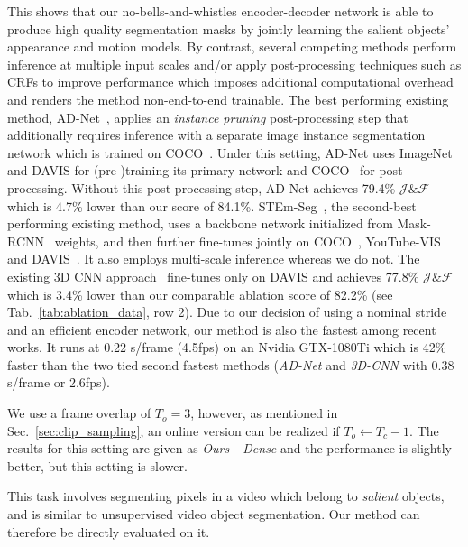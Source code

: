 \documentclass{bmvc2k}
\newcommand{\PAR}[1]{\vskip4pt \noindent {\bf #1~}}
\begin{document}
This shows that our no-bells-and-whistles encoder-decoder network is able to produce high quality segmentation masks by jointly learning the salient objects' appearance and motion models. 
By contrast, several competing methods perform inference at multiple input scales and/or apply post-processing techniques such as CRFs to improve performance which imposes additional computational overhead and renders the method non-end-to-end trainable. 
The best performing existing method, AD-Net~\cite{Yang19ICCVAnchorDiff}, applies an \textit{instance pruning} post-processing step that additionally requires inference with a separate image instance segmentation network which is trained on COCO~\cite{Lin14ECCV}. Under this setting, AD-Net uses ImageNet and DAVIS for (pre-)training its primary network and COCO~\cite{Lin14ECCV} for post-processing. Without this post-processing step, AD-Net achieves 79.4\% $\mathcal{J}\&\mathcal{F}$ which is 4.7\% lower than our score of 84.1\%. STEm-Seg~\cite{athar20arxiv}, the second-best performing existing method, uses a backbone network initialized from Mask-RCNN~\cite{He17ICCV} weights, and then further fine-tunes jointly on COCO~\cite{Lin14ECCV}, YouTube-VIS~\cite{Yang19ICCV} and DAVIS~\cite{Perazzi16CVPR}. It also employs multi-scale inference whereas we do not.
The existing 3D CNN approach~\cite{Hou19BMVC} fine-tunes only on DAVIS and achieves 77.8\% $\mathcal{J}\&\mathcal{F}$ which is 3.4\% lower than our comparable ablation score of 82.2\% (see Tab.~\ref{tab:ablation_data}, row 2).
Due to our decision of using a nominal stride and an efficient encoder network, our method is also the fastest among recent works. It runs at 0.22 s/frame (4.5fps) on an Nvidia GTX-1080Ti which is 42\% faster than the two tied second fastest methods (\textit{AD-Net} and \textit{3D-CNN} with 0.38 s/frame or 2.6fps).


We use a frame overlap of $T_o = 3$, however, as mentioned in Sec.~\ref{sec:clip_sampling}, an online version can be realized if $T_o \gets T_c-1$. The results for this setting are given as \textit{Ours - Dense} and the performance is slightly better, but this setting is slower.  



\PAR{Video Object Saliency:} This task involves segmenting pixels in a video which belong to \textit{salient} objects, and is similar to unsupervised video object segmentation. Our method can therefore be directly evaluated on it. 
\end{document}
